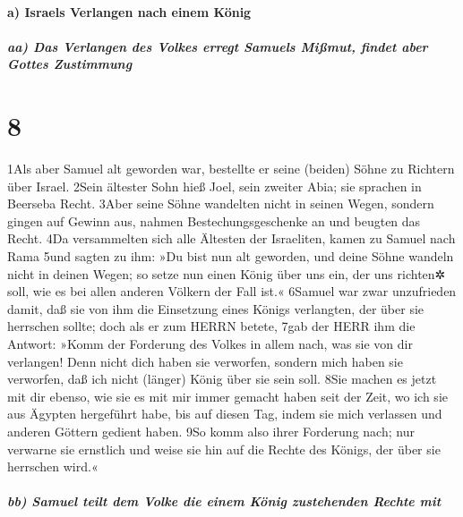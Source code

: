 \hypertarget{a-israels-verlangen-nach-einem-kuxf6nig}{%
\paragraph{a) Israels Verlangen nach einem
König}\label{a-israels-verlangen-nach-einem-kuxf6nig}}

\hypertarget{aa-das-verlangen-des-volkes-erregt-samuels-miuxdfmut-findet-aber-gottes-zustimmung}{%
\subparagraph{aa) Das Verlangen des Volkes erregt Samuels Mißmut, findet
aber Gottes
Zustimmung}\label{aa-das-verlangen-des-volkes-erregt-samuels-miuxdfmut-findet-aber-gottes-zustimmung}}

\hypertarget{section-7}{%
\section{8}\label{section-7}}

1Als aber Samuel alt geworden war, bestellte er seine (beiden) Söhne zu
Richtern über Israel. 2Sein ältester Sohn hieß Joel, sein zweiter Abia;
sie sprachen in Beerseba Recht. 3Aber seine Söhne wandelten nicht in
seinen Wegen, sondern gingen auf Gewinn aus, nahmen Bestechungsgeschenke
an und beugten das Recht. 4Da versammelten sich alle Ältesten der
Israeliten, kamen zu Samuel nach Rama 5und sagten zu ihm: »Du bist nun
alt geworden, und deine Söhne wandeln nicht in deinen Wegen; so setze
nun einen König über uns ein, der uns richten✲ soll, wie es bei allen
anderen Völkern der Fall ist.« 6Samuel war zwar unzufrieden damit, daß
sie von ihm die Einsetzung eines Königs verlangten, der über sie
herrschen sollte; doch als er zum HERRN betete, 7gab der HERR ihm die
Antwort: »Komm der Forderung des Volkes in allem nach, was sie von dir
verlangen! Denn nicht dich haben sie verworfen, sondern mich haben sie
verworfen, daß ich nicht (länger) König über sie sein soll. 8Sie machen
es jetzt mit dir ebenso, wie sie es mit mir immer gemacht haben seit der
Zeit, wo ich sie aus Ägypten hergeführt habe, bis auf diesen Tag, indem
sie mich verlassen und anderen Göttern gedient haben. 9So komm also
ihrer Forderung nach; nur verwarne sie ernstlich und weise sie hin auf
die Rechte des Königs, der über sie herrschen wird.«

\hypertarget{bb-samuel-teilt-dem-volke-die-einem-kuxf6nig-zustehenden-rechte-mit}{%
\subparagraph{bb) Samuel teilt dem Volke die einem König zustehenden
Rechte
mit}\label{bb-samuel-teilt-dem-volke-die-einem-kuxf6nig-zustehenden-rechte-mit}}

